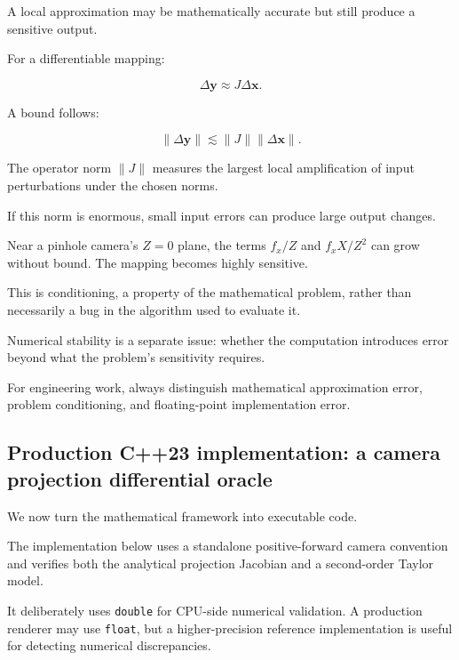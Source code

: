 \hypertarget{02-foundations-ii-ch021-conditioning-versus-approximation-error}{}

A local approximation may be mathematically accurate but still produce a sensitive output.

For a differentiable mapping:

\[
\Delta\mathbf y\approx J\Delta\mathbf x.
\]

A bound follows:

\[
\|\Delta\mathbf y\| \lesssim \|J\|\|\Delta\mathbf x\|.
\]

The operator norm \(\|J\|\) measures the largest local amplification of input perturbations under the chosen norms.

If this norm is enormous, small input errors can produce large output changes.

Near a pinhole camera's \(Z=0\) plane, the terms \(f_x/Z\) and \(f_xX/Z^2\) can grow without bound. The mapping becomes highly sensitive.

This is conditioning, a property of the mathematical problem, rather than necessarily a bug in the algorithm used to evaluate it.

Numerical stability is a separate issue: whether the computation introduces error beyond what the problem's sensitivity requires.

For engineering work, always distinguish mathematical approximation error, problem conditioning, and floating-point implementation error.

\subsection{Production C++23 implementation: a camera projection differential oracle}\label{02-foundations-ii-ch021-production-c23-implementation-a-camera-projection-differential-oracle}

\hypertarget{02-foundations-ii-ch021-production-c23-implementation-a-camera-projection-differential-oracle}{}

We now turn the mathematical framework into executable code.

The implementation below uses a standalone positive-forward camera convention and verifies both the analytical projection Jacobian and a second-order Taylor model.

It deliberately uses \texttt{double} for CPU-side numerical validation. A production renderer may use \texttt{float}, but a higher-precision reference implementation is useful for detecting numerical discrepancies.

